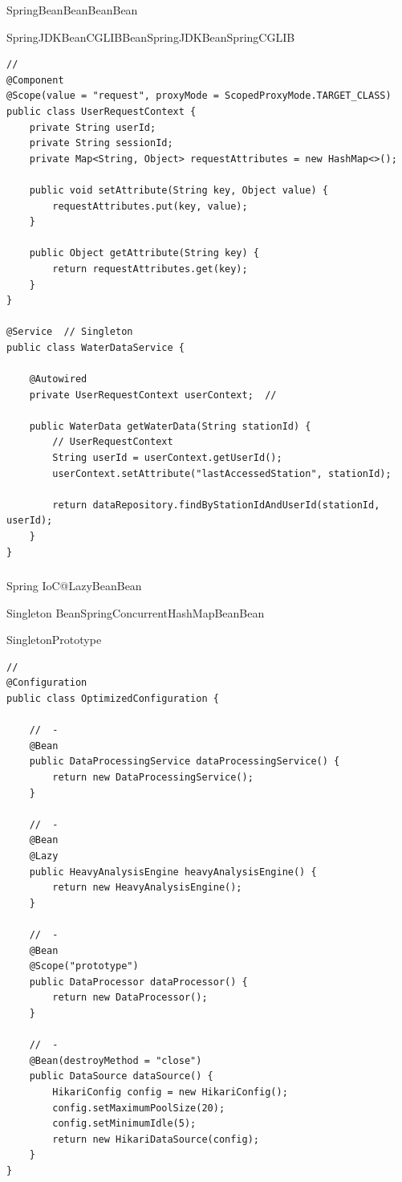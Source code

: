 SpringBeanBeanBeanBean

SpringJDKBeanCGLIBBeanSpringJDKBeanSpringCGLIB

\begin{lstlisting}[style=java]
// 
@Component
@Scope(value = "request", proxyMode = ScopedProxyMode.TARGET_CLASS)
public class UserRequestContext {
    private String userId;
    private String sessionId;
    private Map<String, Object> requestAttributes = new HashMap<>();
    
    public void setAttribute(String key, Object value) {
        requestAttributes.put(key, value);
    }
    
    public Object getAttribute(String key) {
        return requestAttributes.get(key);
    }
}

@Service  // Singleton
public class WaterDataService {
    
    @Autowired
    private UserRequestContext userContext;  // 
    
    public WaterData getWaterData(String stationId) {
        // UserRequestContext
        String userId = userContext.getUserId();
        userContext.setAttribute("lastAccessedStation", stationId);
        
        return dataRepository.findByStationIdAndUserId(stationId, userId);
    }
}
\end{lstlisting}

\hypertarget{section-57}{%
\subsubsection{}\label{section-57}}

Spring IoC@LazyBeanBean

Singleton
BeanSpringConcurrentHashMapBean\important{}Bean

SingletonPrototype

\begin{lstlisting}[style=java]
// 
@Configuration
public class OptimizedConfiguration {
    
    //  - 
    @Bean
    public DataProcessingService dataProcessingService() {
        return new DataProcessingService();
    }
    
    //  - 
    @Bean
    @Lazy
    public HeavyAnalysisEngine heavyAnalysisEngine() {
        return new HeavyAnalysisEngine();
    }
    
    //  - 
    @Bean
    @Scope("prototype")
    public DataProcessor dataProcessor() {
        return new DataProcessor();
    }
    
    //  - 
    @Bean(destroyMethod = "close")
    public DataSource dataSource() {
        HikariConfig config = new HikariConfig();
        config.setMaximumPoolSize(20);
        config.setMinimumIdle(5);
        return new HikariDataSource(config);
    }
}
\end{lstlisting}

